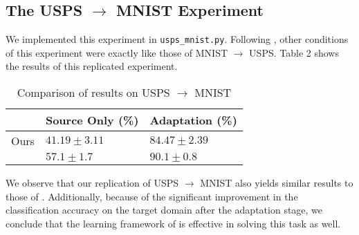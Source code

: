 \documentclass[14pt]{extarticle}
\begin{document}
		\subsection{The USPS $\rightarrow$ MNIST Experiment}
		We implemented this experiment in \texttt{usps\_mnist.py}. Following \cite{adda}, other conditions of this experiment were exactly like those of MNIST $\rightarrow$ USPS. Table 2 shows the results of this replicated experiment.
		\begin{table}[H]
			\centering
			\begin{tabular}{|P{40mm}|P{40mm}|P{40mm}|}
				\hline
				 & Source Only (\%) & Adaptation (\%)\\
				\hline
				Ours & $41.19 \pm 3.11$ & $84.47 \pm 2.39$\\
				\hline
				\cite{adda} & $57.1 \pm 1.7$ & $90.1 \pm 0.8$\\
				\hline
			\end{tabular}
			\caption{Comparison of results on USPS $\rightarrow$ MNIST}
		\end{table}
		We observe that our replication of USPS $\rightarrow$ MNIST also yields similar results to those of \cite{adda}. Additionally, because of the significant improvement in the classification accuracy on the target domain after the adaptation stage, we conclude that the learning framework of \cite{adda} is effective in solving this task as well.
\end{document}
